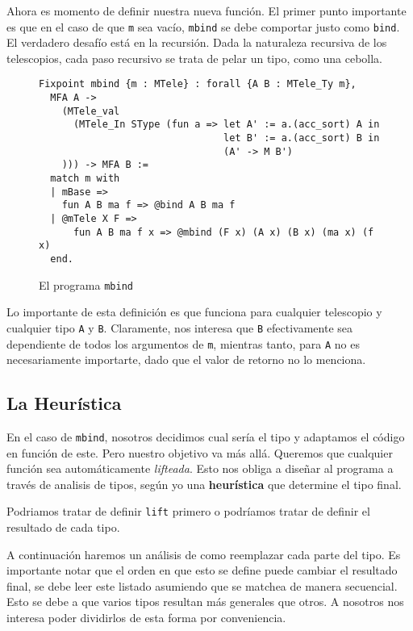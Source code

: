 Ahora es momento de definir nuestra nueva función. El primer punto importante es
que en el caso de que \lstinline{m} sea vacío, \lstinline{mbind} se debe comportar justo
como \lstinline{bind}. El verdadero desafío está en la recursión. Dada la naturaleza
recursiva de los telescopios, cada paso recursivo se trata de pelar un tipo,
como una cebolla.

\begin{figure}[h]
\centering
\begin{lstlisting}
Fixpoint mbind {m : MTele} : forall {A B : MTele_Ty m},
  MFA A ->
    (MTele_val
      (MTele_In SType (fun a => let A' := a.(acc_sort) A in
                                let B' := a.(acc_sort) B in
                                (A' -> M B')
    ))) -> MFA B :=
  match m with
  | mBase =>
    fun A B ma f => @bind A B ma f
  | @mTele X F =>
      fun A B ma f x => @mbind (F x) (A x) (B x) (ma x) (f x)
  end.
\end{lstlisting}
\caption{El programa \lstinline{mbind}}
\label{fig:mbind}
\end{figure}

Lo importante de esta definición es que funciona para cualquier telescopio y
cualquier tipo \lstinline{A} y \lstinline{B}. Claramente, nos interesa que \lstinline{B}
efectivamente sea dependiente de todos los argumentos de \lstinline{m}, mientras
tanto, para \lstinline{A} no es necesariamente importarte, dado que el valor de
retorno no lo menciona.

\subsection{La Heurística}

En el caso de \lstinline{mbind}, nosotros decidimos cual sería el tipo y adaptamos el
código en función de este. Pero nuestro objetivo va más allá. Queremos que
cualquier función sea automáticamente \textit{lifteada}. Esto nos obliga a
diseñar al programa a través de analisis de tipos, según yo una
\textbf{heurística} que determine el tipo final.

Podriamos tratar de definir \lstinline{lift} primero o podríamos tratar de definir el
resultado de cada tipo.

A continuación haremos un análisis de como reemplazar cada parte del tipo. Es
importante notar que el orden en que esto se define puede cambiar el resultado
final, se debe leer este listado asumiendo que se matchea de manera secuencial.
Esto se debe a que varios tipos resultan más generales que otros. A nosotros nos
interesa poder dividirlos de esta forma por conveniencia.

